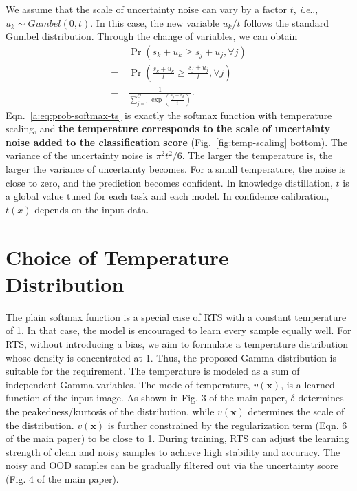 \documentclass[letterpaper]{article} %
\makeatletter
\DeclareRobustCommand\onedot{\futurelet\@let@token\@onedot}
\def\@onedot{\ifx\@let@token.\else.\null\fi\xspace}
\def\ie{\emph{i.e}\onedot} \def\Ie{\emph{I.e}\onedot}
\makeatother
\begin{document}
%
We assume that the scale of uncertainty noise can vary by a factor $t$, \ie, $u_k\sim Gumbel(0, t)$. In this case, the new variable $u_k/t$ follows the standard Gumbel distribution. Through the change of variables, we can obtain
\begin{equation}
  \begin{aligned}
    & \Pr(s_k+u_k \geq s_j+u_j, \forall j) \\
    =\ & \Pr(\frac{s_k+u_k}{t} \geq \frac{s_j+u_j}{t}, \forall j) \\
    =\ & \frac{1}{\sum_{j = 1}^{C} \exp(\frac{s_j - s_k}{t})}.
  \end{aligned}
  \label{a:eq:prob-softmax-ts}
\end{equation}
%
Eqn.~\ref{a:eq:prob-softmax-ts} is exactly the softmax function with temperature scaling, and \textbf{the temperature corresponds to the scale of uncertainty noise added to the classification score} (Fig.~\ref{fig:temp-scaling} bottom). The variance of the uncertainty noise is $\pi^2 t^2 / 6$. The larger the temperature is, the larger the variance of uncertainty becomes. For a small temperature, the noise is close to zero, and the prediction becomes confident.
%
In knowledge distillation, $t$ is a global value tuned for each task and each model. In confidence calibration, $t(x)$ depends on the input data.


\section{Choice of Temperature Distribution}
\label{sec:temp}

The plain softmax function is a special case of RTS with a constant temperature of 1. In that case, the model is encouraged to learn every sample equally well. 
%
For RTS, without introducing a bias, we aim to formulate a temperature distribution whose density is concentrated at 1. 
%
Thus, the proposed Gamma distribution is suitable for the requirement. The temperature is modeled as a sum of independent Gamma variables. The mode of temperature, $v(\bm{x})$, is a learned function of the input image. 
%
As shown in Fig. 3 of the main paper, $\delta$ determines the peakedness/kurtosis of the distribution, while $v(\bm{x})$ determines the scale of the distribution. $v(\bm{x})$ is further constrained by the regularization term (Eqn. 6 of the main paper) to be close to 1. 
%
During training, RTS can adjust the learning strength of clean and noisy samples to achieve high stability and accuracy. The noisy and OOD samples can be gradually filtered out via the uncertainty score (Fig. 4 of the main paper).
\end{document}
